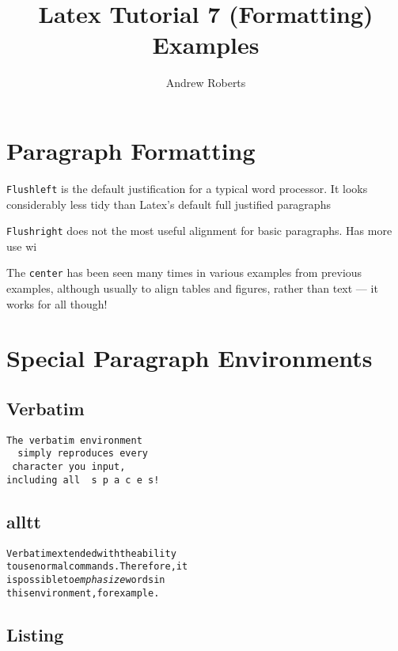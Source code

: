 \documentclass[english]{article}
\begin{document}
\title{Latex Tutorial 7 (Formatting) Examples}
\author{Andrew Roberts}
\maketitle

\section{Paragraph Formatting}

\begin{flushleft}
\texttt{Flushleft} is the default justification for a typical word
processor.  It looks considerably less tidy than Latex's default full
justified paragraphs
\end{flushleft}

\begin{flushright}
\texttt{Flushright} does not the most useful alignment for basic
paragraphs.  Has more use wi \end{flushright}

\begin{center}
The \texttt{center} has been seen many times in various examples from
previous examples, although usually to align tables and figures, rather
than text --- it works for all though!
\end{center}

\section{Special Paragraph Environments}
\subsection{Verbatim}

\begin{verbatim}
The verbatim environment
  simply reproduces every
 character you input,
including all  s p a c e s!
\end{verbatim}

\subsection{alltt}
\begin{alltt}
Verbatim extended with the ability
to use normal commands.  Therefore, it
is possible to \emph{emphasize} words in
this environment, for example.
\end{alltt}

\subsection{Listing}
\end{document}
